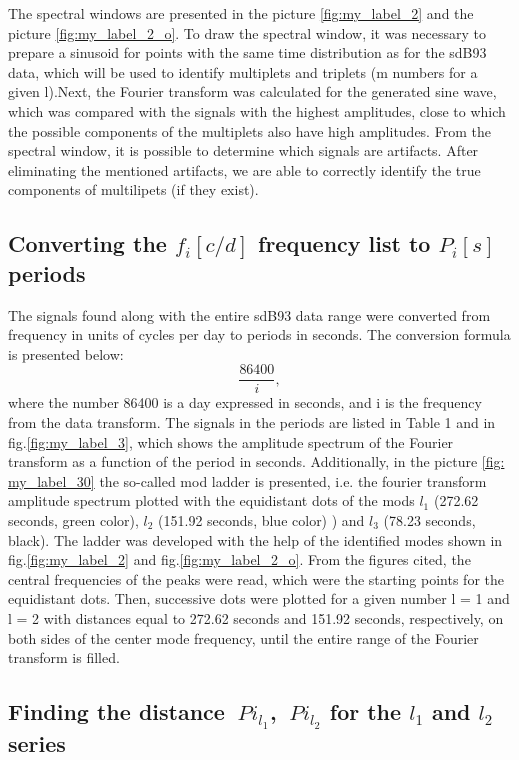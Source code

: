 \documentclass{aa}
\begin{document}
The spectral windows are presented in the picture \ref{fig:my_label_2} and the picture \ref{fig:my_label_2_o}. To draw the spectral window, it was necessary to prepare a sinusoid for points with the same time distribution as for the sdB93 data, which will be used to identify multiplets and triplets (m numbers for a given l).Next, the Fourier transform was calculated for the generated sine wave, which was compared with the signals with the highest amplitudes, close to which the possible components of the multiplets also have high amplitudes. From the spectral window, it is possible to determine which signals are artifacts. After eliminating the mentioned artifacts, we are able to correctly identify the true components of multilipets (if they exist).

\subsection{Converting the $ f_i [c / d] $ frequency list to $ P_i [s] $ periods}

The signals found along with the entire sdB93 data range were converted from frequency in units of cycles per day to periods in seconds. The conversion formula is presented below: $$ \frac{86400}{i}, $$ where the number 86400 is a day expressed in seconds, and i is the frequency from the data transform. The signals in the periods are listed in Table 1 and in fig.\ref{fig:my_label_3}, which shows the amplitude spectrum of the Fourier transform as a function of the period in seconds. Additionally, in the picture \ref{fig: my_label_30} the so-called mod ladder is presented, i.e. the fourier transform amplitude spectrum plotted with the equidistant dots of the mods $ l_1 $ (272.62 seconds, green color), $ l_2 $ (151.92 seconds, blue color) ) and $ l_3 $ (78.23 seconds, black). The ladder was developed with the help of the identified modes shown in fig.\ref{fig:my_label_2} and fig.\ref{fig:my_label_2_o}. From the figures cited, the central frequencies of the peaks were read, which were the starting points for the equidistant dots. Then, successive dots were plotted for a given number l = 1 and l = 2 with distances equal to 272.62 seconds and 151.92 seconds, respectively, on both sides of the center mode frequency, until the entire range of the Fourier transform is filled.

\subsection{Finding the distance $ \ Pi_ {l_1} $, $ \ Pi_ {l_2} $ for the $ l_1 $ and $ l_2 $ series}
\end{document}
